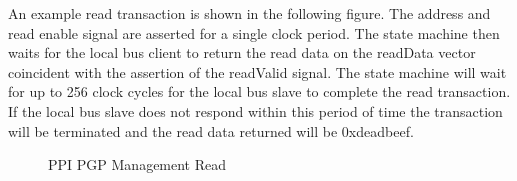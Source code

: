 \documentclass[11pt]{article}
\begin{document}
An example read transaction is shown in the following figure. The address and read enable signal are asserted for a single clock period.
The state machine then waits for the local bus client to return the read data on the readData vector coincident with the assertion 
of the readValid signal. The state machine will wait for up to 256 clock cycles for the local bus slave to complete the read transaction. 
If the local bus slave does not respond within this period of time the transaction will be terminated and the read data returned will be 
0xdeadbeef. 

\begin{figure}[H]
   \centering
   \caption{PPI PGP Management Read}
   \label{fig:ppi_mgmt_read}
\end{figure}
\end{document}
